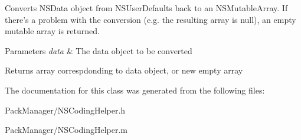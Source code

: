 Converts N\-S\-Data object from N\-S\-User\-Defaults back to an N\-S\-Mutable\-Array. If there's a problem with the conversion (e.\-g. the resulting array is null), an empty mutable array is returned. 
\begin{DoxyParams}{Parameters}
{\em data} & The data object to be converted \\
\hline
\end{DoxyParams}
\begin{DoxyReturn}{Returns}
array correspdonding to data object, or new empty array 
\end{DoxyReturn}


The documentation for this class was generated from the following files\-:\begin{DoxyCompactItemize}
\item 
Pack\-Manager/N\-S\-Coding\-Helper.\-h\item 
Pack\-Manager/N\-S\-Coding\-Helper.\-m\end{DoxyCompactItemize}
